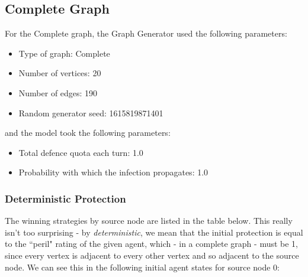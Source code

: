 \documentclass[results.tex]{subfiles}
\begin{document}
\subsection{Complete Graph}

For the Complete graph, the Graph Generator used the following parameters:

\begin{itemize}
\item Type of graph: Complete
\item Number of vertices: 20
\item Number of edges: 190
\item Random generator seed: 1615819871401
\end{itemize}
and the model took the following parameters:
\begin{itemize}
\item Total defence quota each turn: 1.0
\item Probability with which the infection propagates: 1.0
\end{itemize}

\subsubsection{Deterministic Protection}

The winning strategies by source node are listed in the table below. This really isn't too surprising - by {\it deterministic}, we mean that the initial protection is equal to the ``peril" rating of the given agent, which - in a complete graph - must be 1, since every vertex is adjacent to every other vertex and so adjacent to the source node. We can see this in the following initial agent states for source node 0:
\end{document}
